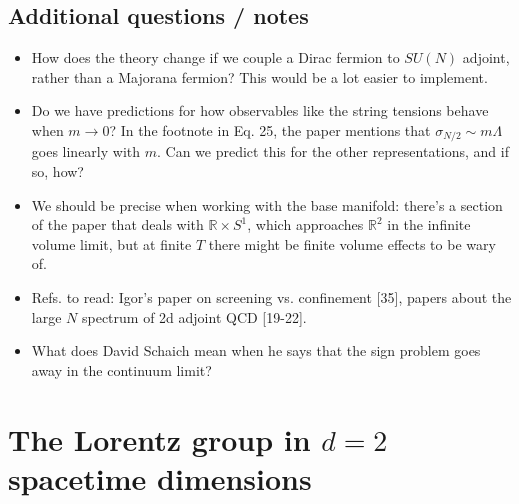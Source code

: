\subsection{Additional questions / notes}

\begin{itemize}
	\item How does the theory change if we couple a Dirac fermion to $SU(N)$ adjoint, rather than a Majorana fermion? This would be a lot easier to implement. 
	\item Do we have predictions for how observables like the string tensions behave when $m\rightarrow 0$? In the footnote in Eq. 25, the paper mentions that $\sigma_{N/2}\sim m \Lambda$ goes linearly with $m$. Can we predict this for the other representations, and if so, how?
	\item We should be precise when working with the base manifold: there's a section of the paper that deals with $\mathbb R\times S^1$, which approaches $\mathbb R^2$ in the infinite volume limit, but at finite $T$ there might be finite volume effects to be wary of. 
	
	\item Refs. to read: Igor's paper on screening vs. confinement [35], papers about the large $N$ spectrum of 2d adjoint QCD [19-22].
	
	\item What does David Schaich mean when he says that the sign problem goes away in the continuum limit?
\end{itemize}

\section{The Lorentz group in $d = 2$ spacetime dimensions}

